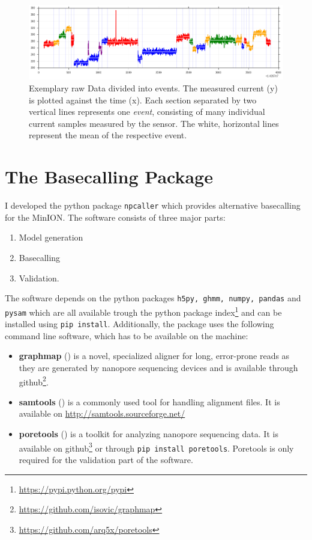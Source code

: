 \documentclass[]{scrartcl}
\begin{document}
\begin{figure}[htbp]
\centering
\includegraphics[width=\linewidth]{figures/squiggle.png}
\caption{Exemplary raw Data divided into events. The measured current (y) is plotted against the time (x). Each section separated by two vertical lines represents one \textit{event}, consisting of many individual current samples measured by the sensor. The white, horizontal lines represent the mean of the respective event. }
\label{fig:squiggle}
\end{figure}



\section{The Basecalling Package}
I developed the python package \texttt{npcaller} which provides alternative basecalling for the MinION. The software consists of three major parts:

\begin{enumerate}
\item Model generation
\item Basecalling
\item Validation.
\end{enumerate}

The software depends on the python packages \texttt{h5py, ghmm, numpy, pandas} and \texttt{pysam} which are all available trough the python package index\footnote{\url{https://pypi.python.org/pypi}} and can be installed using \texttt{pip install}. Additionally, the package uses the following command line software, which has to be available on the machine: 
\begin{itemize}
\item \textbf{graphmap} (\cite{Sovic2015GRAPHMAP}) is a novel, specialized aligner for long, error-prone reads as they are generated by nanopore sequencing devices and is available through github\footnote{\url{https://github.com/isovic/graphmap}}.
\item \textbf{samtools} (\cite{Li2009SAMTOOLS}) is a commonly used tool for handling alignment files. It is available on \url{http://samtools.sourceforge.net/}
\item \textbf{poretools} (\cite{Loman2014PORETOOLS})  is a toolkit for analyzing nanopore sequencing data. It is available on github\footnote{\url{https://github.com/arq5x/poretools}} or through \texttt{pip install poretools}. Poretools is only required for the validation part of the software. 
\end{itemize}
\end{document}
